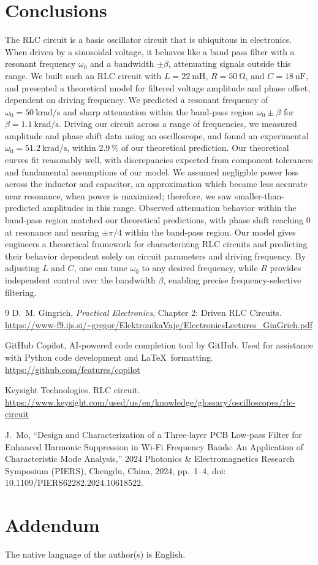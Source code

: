 \documentclass[11pt,twocolumn]{article}
\begin{document}
\section{Conclusions}\label{sec:conclusions}

The RLC circuit is a basic oscillator circuit that is ubiquitous in electronics. When driven by a sinusoidal voltage, it behaves like a band pass filter with a resonant frequency $\omega_0$ and a bandwidth $\pm\beta$, attenuating signals outside this range. We built such an RLC circuit with $L = \qty{22}{\milli\henry}$, $R = \qty{50}{\ohm}$, and $C = \qty{18}{\nano\farad}$, and presented a theoretical model for filtered voltage amplitude and phase offset, dependent on driving frequency. We predicted a resonant frequency of $\omega_0 = \qty{50}{\kilo\radian\per\second}$ and sharp attenuation within the band-pass region $\omega_0 \pm \beta$ for $\beta = \qty{1.1}{\kilo\radian\per\second}$. Driving our circuit across a range of frequencies, we measured amplitude and phase shift data using an oscilloscope, and found an experimental $\omega_0 = \qty{51.2}{\kilo\radian\per\second}$, within 2.9\,\% of our theoretical prediction. Our theoretical curves fit reasonably well, with discrepancies expected from component tolerances and fundamental assumptions of our model. We assumed negligible power loss across the inductor and capacitor, an approximation which became less accurate near resonance, when power is maximized; therefore, we saw smaller-than-predicted amplitudes in this range. Observed attenuation behavior within the band-pass region matched our theoretical predictions, with phase shift reaching 0 at resonance and nearing $\pm\pi/4$ within the band-pass region. Our model gives engineers a theoretical framework for characterizing RLC circuits and predicting their behavior dependent solely on circuit parameters and driving frequency. By adjusting $L$ and $C$, one can tune $\omega_0$ to any desired frequency, while $R$ provides independent control over the bandwidth $\beta$, enabling precise frequency-selective filtering.

\begin{thebibliography}{9}
  D.~M. Gingrich, \textit{Practical Electronics}, Chapter 2: Driven RLC Circuits. \url{https://www-f9.ijs.si/~gregor/ElektronikaVaje/ElectronicsLectures_GinGrich.pdf}

  GitHub Copilot, AI-powered code completion tool by GitHub. Used for assistance with Python code development and \LaTeX\ formatting. \url{https://github.com/features/copilot}

  Keysight Technologies. RLC circuit. \url{https://www.keysight.com/used/us/en/knowledge/glossary/oscilloscopes/rlc-circuit}

  J.~Mo, ``Design and Characterization of a Three-layer PCB Low-pass Filter for Enhanced Harmonic Suppression in Wi-Fi Frequency Bands: An Application of Characteristic Mode Analysis,'' 2024 Photonics \& Electromagnetics Research Symposium (PIERS), Chengdu, China, 2024, pp.~1--4, doi: 10.1109/PIERS62282.2024.10618522.
\end{thebibliography}

\section*{Addendum}
The native language of the author(s) is English.
\end{document}
